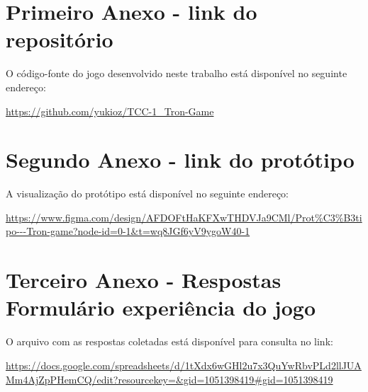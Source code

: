 \begin{anexosenv}

\partanexos

\chapter{Primeiro Anexo - link do repositório}

O código-fonte do jogo desenvolvido neste trabalho está disponível no seguinte endereço:

\vspace{0.5cm}

\url{https://github.com/yukioz/TCC-1_Tron-Game}

\chapter{Segundo Anexo - link do protótipo}

A visualização do protótipo está disponível no seguinte endereço:

\vspace{0.5cm}

\url{https://www.figma.com/design/AFDOFtHaKFXwTHDVJa9CMl/Prot%C3%B3tipo---Tron-game?node-id=0-1&t=wq8JGf6yV9ygoW40-1}

\chapter{Terceiro Anexo - Respostas Formulário experiência do jogo}
\label{anexo:formulario}

O arquivo com as respostas coletadas está disponível para consulta no link:

\url{https://docs.google.com/spreadsheets/d/1tXdx6wGHl2u7x3QuYwRbvPLd2llJUAMm4AjZpPHemCQ/edit?resourcekey=&gid=1051398419#gid=1051398419}


\end{anexosenv}
